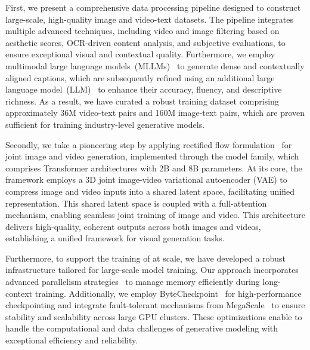 First, we present a comprehensive data processing pipeline designed to construct large-scale, high-quality image and video-text datasets. The pipeline integrates multiple advanced techniques, including video and image filtering based on aesthetic scores, OCR-driven content analysis, and subjective evaluations, to ensure exceptional visual and contextual quality. Furthermore, we employ multimodal large language models~(MLLMs)~\citep{yuan2025tarsier2} to generate dense and contextually aligned captions, which are subsequently refined using an additional large language model~(LLM)~\citep{yang2024qwen2} to enhance their accuracy, fluency, and descriptive richness. As a result, we have curated a robust training dataset comprising approximately 36M video-text pairs and 160M image-text pairs, which are proven sufficient for training industry-level generative models.

Secondly, we take a pioneering step by applying rectified flow formulation~\citep{lipman2023flow} for joint image and video generation, implemented through the \ours model family, which comprises Transformer architectures with 2B and 8B parameters. At its core, the \ours framework employs a 3D joint image-video variational autoencoder (VAE) to compress image and video inputs into a shared latent space, facilitating unified representation. This shared latent space is coupled with a full-attention~\citep{vaswani2017attention} mechanism, enabling seamless joint training of image and video. This architecture delivers high-quality, coherent outputs across both images and videos, establishing a unified framework for visual generation tasks.


Furthermore, to support the training of \ours at scale, we have developed a robust infrastructure tailored for large-scale model training. Our approach incorporates advanced parallelism strategies~\citep{jacobs2023deepspeed, pytorch_fsdp} to manage memory efficiently during long-context training. Additionally, we employ ByteCheckpoint~\citep{wan2024bytecheckpoint} for high-performance checkpointing and integrate fault-tolerant mechanisms from MegaScale~\citep{jiang2024megascale} to ensure stability and scalability across large GPU clusters. These optimizations enable \ours to handle the computational and data challenges of generative modeling with exceptional efficiency and reliability.



